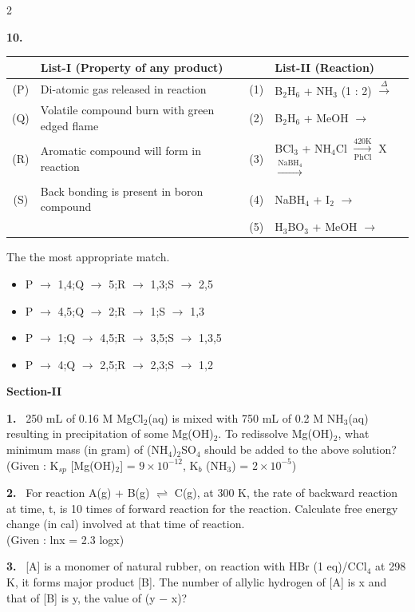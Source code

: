 \documentclass[10pt]{extarticle}
\newcommand{\sect}[1]{\par\smallskip\noindent\textbf{#1}\par}
\newcommand{\qn}[1]{\par\smallskip\noindent\textbf{#1.}~}
\newenvironment{qoptions}{\begin{itemize}[leftmargin=1.8em,itemsep=1pt,topsep=2pt,label={}]}{\end{itemize}}
\newcommand{\opt}[2]{\item[(#1)] #2}
\begin{document}
\begin{multicols}{2}
\qn{10}\par\nopagebreak[4]
\begin{center}\small\setlength{\tabcolsep}{3pt}
\begin{tabular}{|c|p{2.2cm}|c|p{2.9cm}|}
\hline
 & \centering List-I (Property of any product) & & \centering List-II (Reaction) \tabularnewline
\hline
(P) & Di-atomic gas released in reaction & (1) & B$_2$H$_6$ + NH$_3$ (1 : 2) $\xrightarrow{\Delta}$ \\
\hline
(Q) & Volatile compound burn with green edged flame & (2) & B$_2$H$_6$ + MeOH $\to$ \\
\hline
(R) & Aromatic compound will form in reaction & (3) & BCl$_3$ + NH$_4$Cl $\xrightarrow[\text{PhCl}]{\text{420K}}$ X $\xrightarrow{\text{NaBH}_4}$ \\
\hline
(S) & Back bonding is present in boron compound & (4) & NaBH$_4$ + I$_2$ $\to$ \\
\hline
 & & (5) & H$_3$BO$_3$ + MeOH $\to$ \\
\hline
\end{tabular}
\end{center}
The the most appropriate match.
\begin{qoptions}
\opt{A}{P $\to$ 1,4;Q $\to$ 5;R $\to$ 1,3;S $\to$ 2,5}
\opt{B}{P $\to$ 4,5;Q $\to$ 2;R $\to$ 1;S $\to$ 1,3}
\opt{C}{P $\to$ 1;Q $\to$ 4,5;R $\to$ 3,5;S $\to$ 1,3,5}
\opt{D}{P $\to$ 4;Q $\to$ 2,5;R $\to$ 2,3;S $\to$ 1,2}
\end{qoptions}

\sect{Section-II}

\qn{1} 250 mL of 0.16 M MgCl$_2$(aq) is mixed with 750 mL of 0.2 M NH$_3$(aq) resulting in precipitation of some Mg(OH)$_2$. To redissolve Mg(OH)$_2$, what minimum mass (in gram) of (NH$_4$)$_2$SO$_4$ should be added to the above solution?\\
(Given : K$_{sp}$ [Mg(OH)$_2$] = $9\times10^{-12}$, K$_b$ (NH$_3$) = $2\times10^{-5}$)

\qn{2} For reaction A(g) + B(g) $\rightleftharpoons$ C(g), at 300 K, the rate of backward reaction at time, t, is 10 times of forward reaction for the reaction. Calculate free energy change (in cal) involved at that time of reaction.\\
(Given : lnx = 2.3 logx)

\qn{3} [A] is a monomer of natural rubber, on reaction with HBr (1 eq)/CCl$_4$ at 298 K, it forms major product [B]. The number of allylic hydrogen of [A] is x and that of [B] is y, the value of (y $-$ x)?


\end{multicols}
\end{document}
